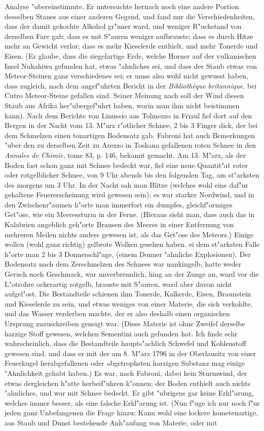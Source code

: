 \documentclass[a4paper, 11pt, oneside, polutonikogreek, german]{article}
\begin{document}
Analyse "ubereinstimmte. Er untersuchte hernach noch eine andere Portion desselben Staues aus einer anderen Gegend, und fand nur die Verschiedenheiten, dass der damit gekochte Alkohol gr"uner ward, und weniger R"uckstand von derselben Fare gab; dass es mit S"auren weniger aufbrauste; dass es durch Hitze mehr an Gewicht verlor; dass es mehr Kieselerde enthielt, und mehr Tonerde und Eisen. (Er glaube, dass die ziegelartige Erde, welche Horner auf der vulkanischen Insel Nukahiwa gefunden hat, etwas "ahnliches sei, und dass der Staub etwas von Meteor-Steinen ganz verschiedenes sei; er muss also wohl nicht gewusst haben, dass zugleich, nach dem angef"uhrten Bericht in der \emph{Bibliothèque britannique}, bei Cutro Meteor-Steine gefallen sind. Seiner Meinung nach soll der Wind diesen Staub aus Afrika her"ubergef"uhrt haben, worin man ihm nicht beistimmen kann). Nach dem Berichte von Linussio aus Tolmezzo in Friaul fiel dort auf den Bergen in der Nacht vom 13. M"arz r"otlicher Schnee, 2 bis 3 Finger dick, der bei dem Schmelzen einen tonartigen Bodensatz gab. Fabroni hat auch Bemerkungen "uber den zu derselben Zeit zu Arezzo in Toskana gefallenen roten Schnee in den \emph{Annales de Chimie}, tome 83, p. 146, bekannt gemacht. Am 13. M"arz, als der Boden fast schon ganz mit Schnee bedeckt war, fiel eine neue Quantit"at roter oder rotgelblicher Schnee, von 9 Uhr abends bis den folgenden Tag, am st"arksten des morgens um 3 Uhr. In der Nacht sah man Blitze (welches wohl eine daf"ur gehaltene Feuererscheinung wird gewesen sein); es war starker Nordwind, und in den Zwischenr"aumen h"orte man immerfort ein dumpfes, gleichf"ormiges Get"ose, wie ein Meeressturm in der Ferne. (Hieraus sieht man, dass auch das in Kalabrien angeblich geh"orte Brausen des Meeres in einer Entfernung von mehreren Meilen nichts anders gewesen ist, als das Get"ose des Meteors.) Einige wollen (wohl ganz richtig) gelbrote Wolken gesehen haben. ei dem st"arksten Falle h"orte man 2 bis 3 Donnerschl"age, (einem Donner "ahnliche Explosionen). Der Bodensatz nach dem Zerschmelzen des Schnees war nankingelb, hatte weder Geruch noch Geschmack, war unverbrennlich, hing an der Zunge an, ward vor die L"otrohre ockerartig rotgelb, brauste mit S"auren, ward aber davon nicht aufgel"ost. Die Bestandteile schienen ihm Tonerde, Kalkerde, Eisen, Braunstein und Kieselerde zu sein, und etwas weniges von einer Materie, die sich verkohlte, und das Wasser verderben machte, der er also deshalb einen organischen Ursprung zuzuschreiben geneigt war. (Diese Materie ist ohne Zweifel derselbe harzige Stoff gewesen, welchen Sementini auch gefunden hat. Ich finde sehr wahrscheinlich, dass die Bestandteile haupts"achlich Schwefel und Kohlenstoff gewesen sind, und dass er mit der am 8. M"arz 1796 in der Oberlausitz von einer Feuerkugel herabgefallenen oder abgetrophsten harzigen Substanz mag einige "Ahnlichkeit gehabt haben.) Es war, nach Fabroni, dabei kein Sturmwind, der etwas dergleichen h"atte herbeif"uhren k"onnen; der Boden enthielt auch nichts "ahnliches, und war mit Schnee bedeckt. Er gibt "ubrigens gar keine Erkl"arung, welches immer besser, als eine falsche Erkl"arung ist. (Nun f"uge ich nur noch f"ur jeden ganz Unbefangenen die Frage hinzu: Kann wohl eine lockere kometenartige, aus Staub und Dunst bestehende Anh"aufung von Materie, oder mit 
\end{document}
